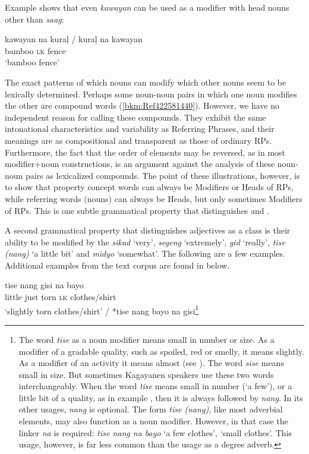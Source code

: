 Example  shows that even \textit{kawayan} can be used as a modifier with head nouns other than \textit{saag}:

\ea
\label{bkm:Ref422581440}
\gll kawayan na kuraļ / kuraļ na kawayan \\
bamboo \textsc{lk} fence \\
\glt ‘bamboo fence’
\z

The exact patterns of which nouns can modify which other nouns seem to be lexically determined. Perhaps some noun-noun pairs in which one noun modifies the other are compound words (\ref{bkm:Ref422581440}). However, we have no independent reason for calling these compounds. They exhibit the same intonational characteristics and variability as Referring Phrases, and their meanings are as compositional and transparent as those of ordinary RPs. Furthermore, the fact that the order of elements may be reversed, as in most modifier+noun constructions, is an argument against the analysis of these noun-noun pairs as lexicalized compounds. The point of these illustrations, however, is to show that property concept words can always be Modifiers or Heads of RPs, while referring words (nouns) can always be Heads, but only sometimes Modifiers of RPs. This is one subtle grammatical property that distinguishes  and .

A second grammatical property that distinguishes adjectives as a class is their ability to be modified by the  \textit{sikad} ‘very’, \textit{segeng} ‘extremely’, \textit{gid} ‘really’, \textit{tise (nang)} ‘a little bit’ and \textit{midyo} ‘somewhat’. The following are a few examples. Additional examples from the text corpus are found in  below.

\ea
\gll tise  nang  gisi  na  bayo \\
little  just  torn  \textsc{lk}  clothes/shirt \\
\glt ‘slightly torn clothes/shirt’ /
*tise nang bayo na gisi\footnote{The word \textit{tise} as a noun modifier means small in number or size. As a modifier of a gradable quality, such as spoiled, red or smelly, it means slightly. As a modifier of an activity it means almost (see ). The word \textit{sise} means small in size. But sometimes Kagayanen speakers use these two words interchangeably. When the word \textit{tise} means small in number (‘a few’), or a little bit of a quality, as in example , then it is always followed by \textit{nang}. In its other usages, \textit{nang} is optional. The form \textit{tise (nang)}, like most adverbial elements, may also function as a noun modifier. However, in that case the linker \textit{na} is required: \textit{tise nang na bayo} ‘a few clothes’, ‘small clothes’. This usage, however, is far less common than the usage as a degree adverb.}
\z

